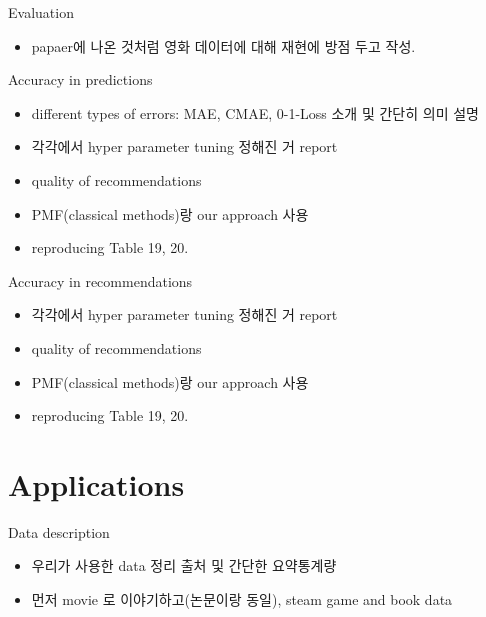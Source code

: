 \documentclass{beamer}
\begin{document}
\begin{frame}{Evaluation}
    \begin{itemize}
        \item papaer에 나온 것처럼 영화 데이터에 대해 재현에 방점 두고 작성.
    \end{itemize}
\end{frame}

\begin{frame}{Accuracy in predictions}
    \begin{itemize}
        \item different types of errors: MAE, CMAE, 0-1-Loss 소개 및 간단히 의미 설명
        \item 각각에서 hyper parameter tuning 정해진 거 report
        \item quality of recommendations
        \item PMF(classical methods)랑 our approach 사용
        \item reproducing Table 19, 20.
    \end{itemize}
\end{frame}

\begin{frame}{Accuracy in recommendations}
    \begin{itemize}
        \item 각각에서 hyper parameter tuning 정해진 거 report
        \item quality of recommendations
        \item PMF(classical methods)랑 our approach 사용
        \item reproducing Table 19, 20.
    \end{itemize}
\end{frame}


\section{Applications}
\begin{frame}{Data description}
    \begin{itemize}
        \item 우리가 사용한 data 정리 출처 및 간단한 요약통계량
        \item 먼저 movie 로 이야기하고(논문이랑 동일), steam game and book data
    \end{itemize}
\end{frame}
\end{document}
